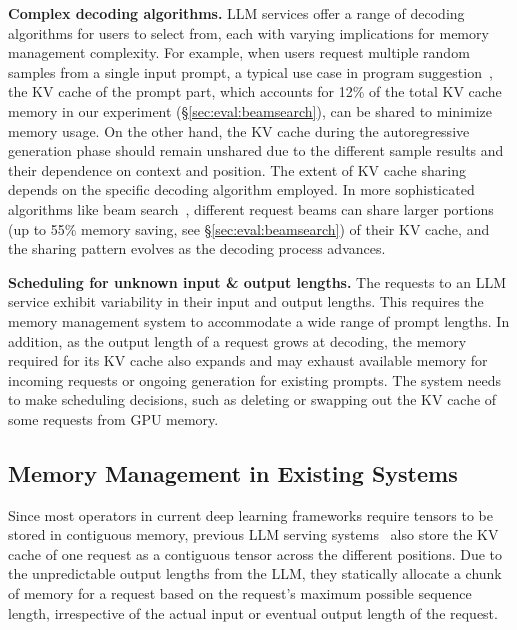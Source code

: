\textbf{Complex decoding algorithms.} LLM services offer a range of decoding algorithms for users to select from, each with varying implications for memory management complexity. For example, when users request multiple random samples from a single input prompt, a typical use case in program suggestion~\cite{copilot}, the KV cache of the prompt part, which accounts for 12\% of the total KV cache memory in our experiment (\S\ref{sec:eval:beamsearch}), can be shared to minimize memory usage. On the other hand, the KV cache during the autoregressive generation phase should remain unshared due to the different sample results and their dependence on context and position. The extent of KV cache sharing depends on the specific decoding algorithm employed. In more sophisticated algorithms like beam search~\cite{sutskever2014sequence}, different request beams can share larger portions (up to 55\% memory saving, see \S\ref{sec:eval:beamsearch}) of their KV cache, and the sharing pattern evolves as the decoding process advances. 

\textbf{Scheduling for unknown input \& output lengths.} The requests to an LLM service exhibit variability in their input and output lengths. This requires the memory management system to accommodate a wide range of prompt lengths. In addition, as the output length of a request grows at decoding, the memory required for its KV cache also expands and may exhaust available memory for incoming requests or ongoing generation for existing prompts. The system needs to make scheduling decisions, such as deleting or swapping out the KV cache of some requests from GPU memory.

\subsection{Memory Management in Existing Systems}

\label{sec:memory-management-in-existing-systems}

Since most operators in current deep learning frameworks \cite{paszke2019pytorch, olston2017tensorflow} require tensors to be stored in contiguous memory, previous LLM serving systems~\cite{yu2022orca,nvidiaft} also store the KV cache of one request as a contiguous tensor across the different positions. Due to the unpredictable output lengths from the LLM, they statically allocate a chunk of memory for a request based on the request's maximum possible sequence length, irrespective of the actual input or eventual output length of the request. 

